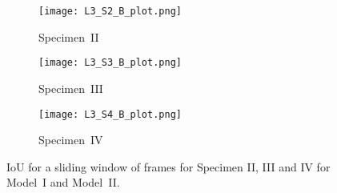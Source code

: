 \begin{sloppypar}
	\begin{figure}[!ht]
		\centering
		\begin{subfigure}[b]{0.8\textwidth}
			\centering
			\texttt{[image: L3\_S2\_B\_plot.png]}
			\caption{Specimen~II}
			\label{fig:L3_S2_B_333x333p_50kHz_5HC_IoU}
		\end{subfigure}
		\par\medskip
		\begin{subfigure}[b]{0.8\textwidth}
			\centering
			\texttt{[image: L3\_S3\_B\_plot.png]}
			\caption{Specimen~III} 
			\label{fig:L3_S3_B_333x333p_50kHz_5HC_shapes_}
		\end{subfigure}
		\par\medskip
		\begin{subfigure}[b]{0.8\textwidth}
			\centering
			\texttt{[image: L3\_S4\_B\_plot.png]}
			\caption{Specimen~IV} 
			\label{fig:L3_S4_B_333x333p_50kHz_5HC_shapes_}
		\end{subfigure}
		\caption{IoU for a sliding window of frames for Specimen II, III and IV for Model~I and Model~II.}
		\label{fig:L3_S234_B_333x333p_50kHz_5HC_IoU_centre_window}
	\end{figure} 

	

\end{sloppypar}

